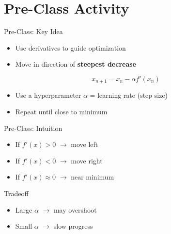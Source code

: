 \documentclass[dvipsnames]{beamer}
\begin{document}
\section{Pre-Class Activity}

\begin{frame}{Pre-Class: Key Idea}
\begin{itemize}
    \item Use derivatives to guide optimization
    \item Move in direction of \textbf{steepest decrease}
\end{itemize}



\[
x_{n+1} = x_n - \alpha f'(x_n)
\]



\begin{itemize}
    \item Use a hyperparameter $\alpha$ = learning rate (step size)
    \item Repeat until close to minimum
\end{itemize}

\end{frame}


\begin{frame}{Pre-Class: Intuition}
\begin{itemize}
    \item If $f'(x) > 0$ $\rightarrow$ move left
    \item If $f'(x) < 0$ $\rightarrow$ move right
    \item If $f'(x) \approx 0$ $\rightarrow$ near minimum
\end{itemize}



\begin{block}{Tradeoff}
\begin{itemize}
    \item Large $\alpha$ $\rightarrow$ may overshoot
    \item Small $\alpha$ $\rightarrow$ slow progress
\end{itemize}
\end{block}

\end{frame}

\end{document}
